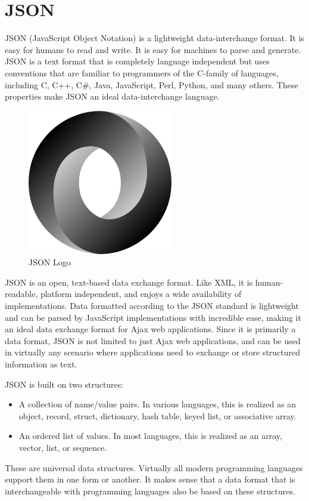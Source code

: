 \section{JSON}

JSON (JavaScript Object Notation) is a lightweight data-interchange format. It is easy for humans to read and write. It is easy for machines to parse and generate. JSON is a text format that is completely language independent but uses conventions that are familiar to programmers of the C-family of languages, including C, C++, C\#, Java, JavaScript, Perl, Python, and many others. These properties make JSON an ideal data-interchange language.

\begin{figure}
	\centering
	\includegraphics[width=0.4\linewidth]{images/JSON_vector_logo}
	\caption{JSON Logo}
	\label{fig:240px-jsonvectorlogo}
\end{figure}

JSON is an open, text-based data exchange format. Like XML, it is human-readable, platform independent, and enjoys a wide availability of implementations. Data formatted according to the JSON standard is lightweight and can be parsed by JavaScript implementations with incredible ease, making it an ideal data exchange format for Ajax web applications. Since it is primarily a data format, JSON is not limited to just Ajax web applications, and can be used in virtually any scenario where applications need to exchange or store structured information as text.

JSON is built on two structures:

\begin{itemize}
	\item A collection of name/value pairs. In various languages, this is realized as an object, record, struct, dictionary, hash table, keyed list, or associative array.
	\item An ordered list of values. In most languages, this is realized as an array, vector, list, or sequence.
\end{itemize}

These are universal data structures. Virtually all modern programming languages support them in one form or another. It makes sense that a data format that is interchangeable with programming languages also be based on these structures.
